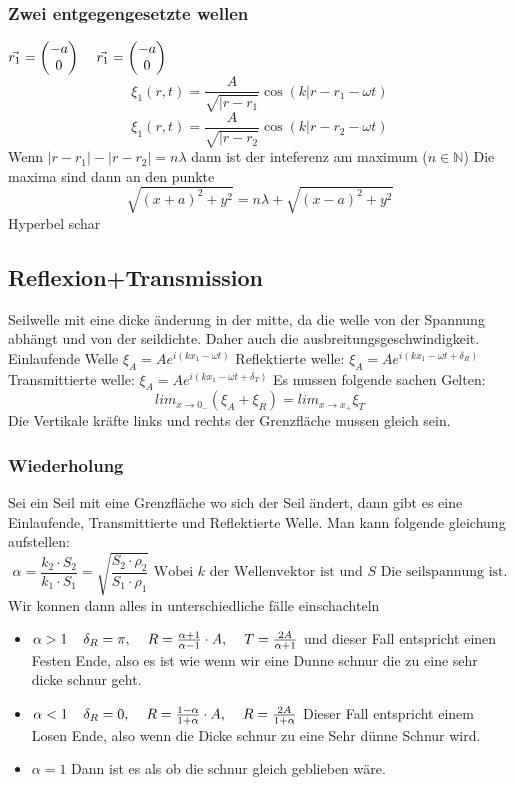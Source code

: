 \documentclass{article}
\newcommand{\mspc}{\hspace{0.4cm}}
\begin{document}
    \subsubsection{Zwei entgegengesetzte wellen}
    $\vec{r_1}=\begin{pmatrix}-a\\0\end{pmatrix}\mspc\vec{r_1}=\begin{pmatrix}-a\\0\end{pmatrix}$
    \[\xi_1(r,t)=\frac{A}{\sqrt{|r-r_1}}\cos(k|r-r_1-\omega t)\]
    \[\xi_1(r,t)=\frac{A}{\sqrt{|r-r_2}}\cos(k|r-r_2-\omega t)\]
    Wenn $|r-r_1|-|r-r_2|=n\lambda$ dann ist der inteferenz am maximum ($n\in \mathbb{N}$)
    Die maxima sind dann an den punkte
    \[\sqrt{(x+a)^2+y^2}=n\lambda+\sqrt{(x-a)^2+y^2}\]
    Hyperbel schar
    \newline
\subsection{Reflexion+Transmission}
Seilwelle mit eine dicke änderung in der mitte, da die welle von der Spannung abhängt und von der seildichte. Daher auch die ausbreitungsgeschwindigkeit.
    Einlaufende Welle $\xi_A=Ae^{i(kx_1-\omega t)}$\newline
    Reflektierte welle: $\xi_A=Ae^{i(kx_1-\omega t+\delta_R)}$\newline
    Transmittierte welle: $\xi_A=Ae^{i(kx_1-\omega t+\delta_T)}$\newline
Es mussen folgende sachen Gelten:\[lim_{x\rightarrow 0_-}(\xi_A+\xi_R)=lim_{x\rightarrow x_+}\xi_T\]
Die Vertikale kräfte links und rechts der Grenzfläche mussen gleich sein.
\newline
\subsubsection{Wiederholung} Sei ein Seil mit eine Grenzfläche wo sich der Seil ändert, dann gibt es eine Einlaufende, Transmittierte und Reflektierte Welle. Man kann folgende gleichung aufstellen:
\[\alpha=\frac{k_2\cdot S_2}{k_1\cdot S_1}=\sqrt{\frac{S_2\cdot\rho_2}{S_1\cdot\rho_1}}\text{ Wobei } k \text{ der Wellenvektor ist und } S \text{ Die seilspannung ist.}\]
Wir konnen dann alles in unterschiedliche fälle einschachteln \begin{itemize}
  \item{$\alpha>1\mspc\delta_R=\pi, \mspc R=\frac{\alpha+1}{\alpha-1}\cdot A,\mspc T =\frac{2A}{\alpha+1}$ und dieser Fall entspricht einen Festen Ende, also es ist wie wenn wir eine Dunne schnur die zu eine sehr dicke schnur geht.}
  \item{$\alpha<1 \mspc \delta_R=0,\mspc R=\frac{1-\alpha}{1+\alpha}\cdot A,\mspc R=\frac{2A}{1+\alpha}$ Dieser Fall entspricht einem Losen Ende, also wenn die Dicke schnur zu eine Sehr dünne Schnur wird. }
  \item{$\alpha=1$ Dann ist es als ob die schnur gleich geblieben wäre. }
\end{itemize}
\end{document}
